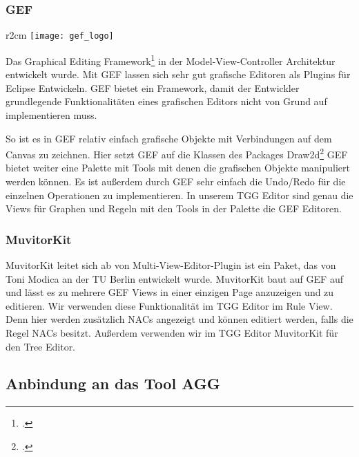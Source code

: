 \subsubsection{GEF}
\begin{wrapfigure}{r}{2cm}
	\centering
	\texttt{[image: gef\_logo]}
	\label{fig:gef_logo}
\end{wrapfigure}
Das Graphical Editing Framework\footcite[][\url{http://www.eclipse.org/modeling/gef/}]{gefwebsite}
in der Model-View-Controller Architektur entwickelt wurde.
Mit GEF lassen sich sehr gut grafische Editoren als Plugins für Eclipse Entwickeln. GEF bietet 
ein Framework, damit der Entwickler grundlegende Funktionalitäten
eines grafischen Editors nicht von Grund auf implementieren muss.


So ist es in GEF relativ einfach grafische Objekte mit Verbindungen auf dem
Canvas zu zeichnen. Hier setzt GEF auf die Klassen des Packages
Draw2d\footcite[][\url{http://www.eclipse.org/gef/draw2d/}]{draw2dwebsite}
GEF bietet weiter eine Palette mit Tools mit denen die grafischen Objekte
manipuliert werden können. Es ist außerdem durch GEF sehr einfach die Undo/Redo
für die einzelnen Operationen zu implementieren.
In unserem TGG Editor sind genau die Views für Graphen und
Regeln mit den Tools in der Palette die GEF Editoren.

\subsubsection{MuvitorKit}
MuvitorKit leitet sich ab von Multi-View-Editor-Plugin
ist ein Paket, das von Toni Modica an der TU Berlin entwickelt wurde. MuvitorKit
baut auf GEF auf und lässt es zu mehrere GEF Views in einer einzigen Page
anzuzeigen und zu editieren. Wir verwenden diese Funktionalität im TGG Editor
im Rule View. Denn hier werden zusätzlich NACs
angezeigt und können editiert werden, falls die Regel NACs besitzt. Außerdem
verwenden wir im TGG Editor MuvitorKit für den Tree Editor.

\subsection{Anbindung an das Tool AGG}

